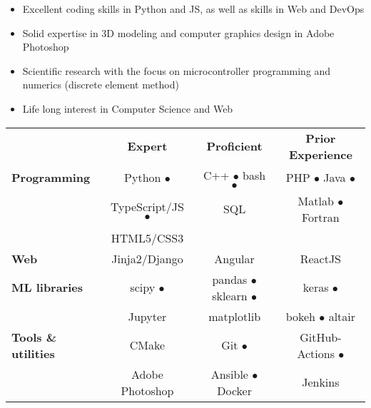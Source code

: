 \documentclass[
  a4paper
]{../FortySecondsCV/fortysecondscv}
\begin{document}
\makefrontsidebar


\begin{itemize}[leftmargin=*]\setlength\itemsep{-.5em}
\item Excellent coding skills in Python and JS, as well as skills in Web and DevOps
\item Solid expertise in 3D modeling and computer graphics design in Adobe Photoshop
\item Scientific research with the focus on microcontroller programming and numerics (discrete element method)
\item Life long interest in Computer Science and Web
\end{itemize}


\setlength{\tabcolsep}{.5em}
\begin{tabular}{ l c  c  c }
  & \textcolor{black!50}{\textbf{Expert}}
  & \textcolor{black!50}{\textbf{Proficient}} %
  & \textcolor{black!50}{\textbf{Prior Experience}} \\
  \textbf{Programming} & Python $\bullet$ & C++ $\bullet$ bash $\bullet$ & PHP $\bullet$ Java $\bullet$ \\
  & TypeScript/JS $\bullet$ & SQL & Matlab $\bullet$ Fortran \\
  & HTML5/CSS3 &  &  \\
  \textbf{Web} & Jinja2/Django & Angular & ReactJS \\
  \textbf{ML libraries} & scipy $\bullet$ & pandas $\bullet$ sklearn $\bullet$ & keras $\bullet$ \\
  & Jupyter & matplotlib &  bokeh $\bullet$ altair \\
  \textbf{Tools \& utilities} & CMake & Git $\bullet$ & GitHub-Actions $\bullet$  \\
  & Adobe Photoshop & Ansible $\bullet$ Docker & Jenkins \\
\end{tabular}
\setlength{\tabcolsep}{0em}

\graphicspath{{../FortySecondsCV/pics/gosquared-flags/flags/flags-iso/shiny/64/}}

\end{document}
